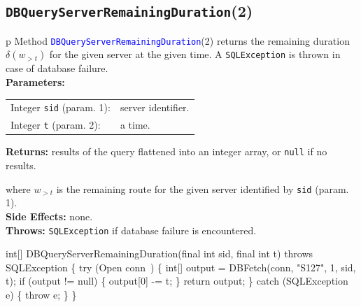 \subsection{{\tt{}\protect{}DBQueryServerRemainingDuration}(2)}
\begin{tabular}{p{\textwidth}}
\toprule
{}
Method \textcolor{blue}{{\tt{}\protect{}DBQueryServerRemainingDuration}}(2) returns the
remaining duration $\delta(w_{>t})$ for the given server at the given time.
A {\tt{}SQLException} is thrown in case of database failure.\\
\midrule
\textbf{Parameters:} \\
\begin{tabular}{lp{116mm}}
Integer {\tt{}sid} (param. 1):&server identifier.\\
Integer {\tt{}t} (param. 2):&a time.\\
\end{tabular}
\textbf{Returns:} results of the query flattened into an integer array,
or {\tt{}null} if no results.


where $w_{>t}$ is the remaining route for the given server identified by {\tt{}sid} (param. 1).\\
\textbf{Side Effects:} none.\\
\textbf{Throws:} {\tt{}SQLException} if database failure is encountered.\\
\bottomrule
\end{tabular}
\nwenddocs{}\endmoddef{}
int[] DBQueryServerRemainingDuration(final int sid, final int t)
throws SQLException \{
  try (\LA{}Open \code{}conn\edoc{}~{\nwtagstyle{}}\RA{}) \{
    int[] output = DBFetch(conn, "S127", 1, sid, t);
    if (output != null) \{
      output[0] -= t;
    \}
    return output;
  \} catch (SQLException e) \{
    throw e;
  \}
\}
\eatline
